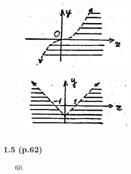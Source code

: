 \documentclass[11pt]{amsbook}
\begin{document}
    \begin{figure}[htbp]
        \centering
            \begin{minipage}{.5\textwidth}
            \centering
            \includegraphics[width=0.5\textwidth]{images/b1p1-113-fig07.pdf}
            \label{fig:test1}
        \end{minipage}%
        \begin{minipage}{.5\textwidth}
            \centering
            \includegraphics[width=0.5\textwidth]{images/b1p1-113-fig08.pdf}
            \label{fig:test2}
        \end{minipage}
    \end{figure}   

\subsubsection*{1.5 (p.62)}
\begin{itemize}
    \item[60.]
    \begin{multicols}{1}
    \end{multicols}
\end{itemize}
\end{document}
